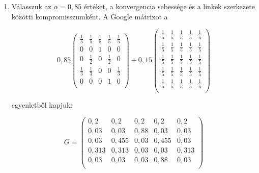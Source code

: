 \documentclass[12pt,a4paper]{article}
\begin{document}
\begin{enumerate}[label=(\Roman*)]
\item Válasszuk az $\alpha = 0,85$ értéket, a konvergencia sebessége és a linkek szerkezete közötti kompromisszumként. A Google mátrixot a 
\vspace{-1cm}
\begin{center}
	\[0,85
	\begin{pmatrix}
	\frac{1}{5} & \frac{1}{5} & \frac{1}{5} & \frac{1}{5} & \frac{1}{5} \\
	0 & 0 & 1 & 0 & 0 \\
	0 & \frac{1}{2} & 0 & \frac{1}{2} & 0 \\
	\frac{1}{3} & \frac{1}{3} & 0 & 0 & \frac{1}{3} \\
	0 & 0 & 0 & 1 & 0 \\
	\end{pmatrix}
	+ 0,15 
	\begin{pmatrix}
	\frac{1}{5} & \frac{1}{5} & \frac{1}{5} & \frac{1}{5} & \frac{1}{5} \\
	\frac{1}{5} & \frac{1}{5} & \frac{1}{5} & \frac{1}{5} & \frac{1}{5} \\
	\frac{1}{5} & \frac{1}{5} & \frac{1}{5} & \frac{1}{5} & \frac{1}{5} \\
	\frac{1}{5} & \frac{1}{5} & \frac{1}{5} & \frac{1}{5} & \frac{1}{5} \\
	\frac{1}{5} & \frac{1}{5} & \frac{1}{5} & \frac{1}{5} & \frac{1}{5} \\
	\end{pmatrix}
	\]
\end{center}
egyenletből kapjuk:
\vspace{-1cm}
\begin{center}
	\[G =
	\begin{pmatrix}
	0,\!2 & 0,\!2 & 0,\!2 & 0,\!2 & 0,\!2 \\
	0,\!03 & 0,\!03 & 0,\!88 & 0,\!03 & 0,\!03 \\
	0,\!03 & 0,\!455 & 0,\!03 & 0,\!455 & 0,\!03 \\
	0,\!313 & 0,\!313 & 0,\!03 & 0,\!03 & 0,\!313 \\
	0,\!03 & 0,\!03 & 0,\!03 & 0,\!88 & 0,\!03 \\
	\end{pmatrix}
	\]
\end{center} 


\end{enumerate}
\end{document}
